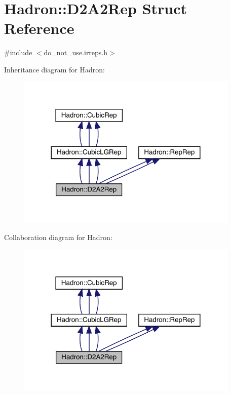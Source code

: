 \hypertarget{structHadron_1_1D2A2Rep}{}\section{Hadron\+:\+:D2\+A2\+Rep Struct Reference}
\label{structHadron_1_1D2A2Rep}


{\ttfamily \#include $<$do\+\_\+not\+\_\+use.\+irreps.\+h$>$}



Inheritance diagram for Hadron\+:
\nopagebreak
\begin{figure}[H]
\begin{center}
\leavevmode
\includegraphics[width=300pt]{dd/d8b/structHadron_1_1D2A2Rep__inherit__graph}
\end{center}
\end{figure}


Collaboration diagram for Hadron\+:
\nopagebreak
\begin{figure}[H]
\begin{center}
\leavevmode
\includegraphics[width=300pt]{dd/d35/structHadron_1_1D2A2Rep__coll__graph}
\end{center}
\end{figure}

